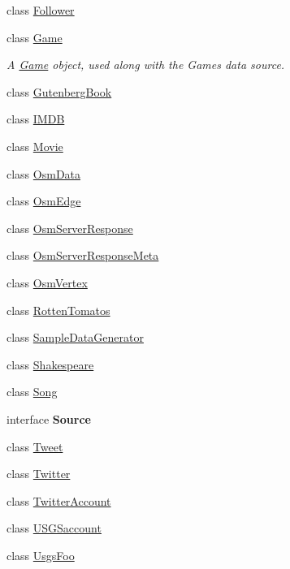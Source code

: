 \begin{DoxyCompactItemize}
\item 
class \mbox{\hyperlink{classbridges_1_1data__src__dependent_1_1_follower}{Follower}}
\item 
class \mbox{\hyperlink{classbridges_1_1data__src__dependent_1_1_game}{Game}}
\begin{DoxyCompactList}\small\item\em A \mbox{\hyperlink{classbridges_1_1data__src__dependent_1_1_game}{Game}} object, used along with the Games data source. \end{DoxyCompactList}\item 
class \mbox{\hyperlink{classbridges_1_1data__src__dependent_1_1_gutenberg_book}{Gutenberg\+Book}}
\item 
class \mbox{\hyperlink{classbridges_1_1data__src__dependent_1_1_i_m_d_b}{I\+M\+DB}}
\item 
class \mbox{\hyperlink{classbridges_1_1data__src__dependent_1_1_movie}{Movie}}
\item 
class \mbox{\hyperlink{classbridges_1_1data__src__dependent_1_1_osm_data}{Osm\+Data}}
\item 
class \mbox{\hyperlink{classbridges_1_1data__src__dependent_1_1_osm_edge}{Osm\+Edge}}
\item 
class \mbox{\hyperlink{classbridges_1_1data__src__dependent_1_1_osm_server_response}{Osm\+Server\+Response}}
\item 
class \mbox{\hyperlink{classbridges_1_1data__src__dependent_1_1_osm_server_response_meta}{Osm\+Server\+Response\+Meta}}
\item 
class \mbox{\hyperlink{classbridges_1_1data__src__dependent_1_1_osm_vertex}{Osm\+Vertex}}
\item 
class \mbox{\hyperlink{classbridges_1_1data__src__dependent_1_1_rotten_tomatos}{Rotten\+Tomatos}}
\item 
class \mbox{\hyperlink{classbridges_1_1data__src__dependent_1_1_sample_data_generator}{Sample\+Data\+Generator}}
\item 
class \mbox{\hyperlink{classbridges_1_1data__src__dependent_1_1_shakespeare}{Shakespeare}}
\item 
class \mbox{\hyperlink{classbridges_1_1data__src__dependent_1_1_song}{Song}}
\item 
interface {\bfseries Source}
\item 
class \mbox{\hyperlink{classbridges_1_1data__src__dependent_1_1_tweet}{Tweet}}
\item 
class \mbox{\hyperlink{classbridges_1_1data__src__dependent_1_1_twitter}{Twitter}}
\item 
class \mbox{\hyperlink{classbridges_1_1data__src__dependent_1_1_twitter_account}{Twitter\+Account}}
\item 
class \mbox{\hyperlink{classbridges_1_1data__src__dependent_1_1_u_s_g_saccount}{U\+S\+G\+Saccount}}
\item 
class \mbox{\hyperlink{classbridges_1_1data__src__dependent_1_1_usgs_foo}{Usgs\+Foo}}
\end{DoxyCompactItemize}
